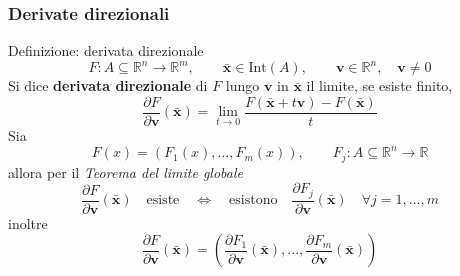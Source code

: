 \documentclass[x11names]{article}
\begin{document}
	\subsubsection{Derivate direzionali}
	\begin{center}
		\colorbox{myblue}{\begin{minipage}{5.75in}
				\begin{blues}{Definizione: derivata direzionale}
					\[
					F:A \subseteq \mathbb{R}^n \to \mathbb{R}^m, \qquad \boldsymbol{\bar{x}} \in \text{Int}(A), \qquad 					      \boldsymbol{v} \in \mathbb{R}^n, \quad \boldsymbol{v} \neq 0
					\]
					Si dice \textbf{derivata direzionale} di $F$ lungo $\boldsymbol{v}$ in  $\boldsymbol{\bar{x}}$ il limite, se esiste finito,
					\begin{equation}
						\frac{\partial F}{\partial \boldsymbol{v}}(\boldsymbol{\bar{x}}) = \lim_{t\to0} \frac{F( \boldsymbol{\bar{x}} + t \boldsymbol{v}) - F( \boldsymbol{\bar{x}} )}{t}
					\end{equation}
					Sia
					\[ 
					F(x) = \left(F_{1}(x),\dots,F_{m}(x)\right),\qquad F_{j}:A\subseteq \mathbb{R}^n\to\mathbb{R}
					\]
					allora per il \textit{Teorema del limite globale}
					\[ 
					\frac{\partial F}{\partial \boldsymbol{v}}(\boldsymbol{\bar{x}}) \quad \text{esiste} \quad \Longleftrightarrow \quad \text{esistono} \quad \frac{\partial F_{j}}{\partial 		\boldsymbol{v}}(\boldsymbol{\bar{x}}) \quad \forall j = 1,\dots,m
					\]
					inoltre
					\[ 
					\frac{\partial F}{\partial \boldsymbol{v}}(\boldsymbol{\bar{x}})=\left(\frac{\partial F_1}{\partial \boldsymbol{v}}(\boldsymbol{\bar{x}}),...,\frac{\partial F_m}{\partial \boldsymbol{v}}(\boldsymbol{\bar{x}})\right)
					\]
				\end{blues}
		\end{minipage}}       
	\end{center}
	
\end{document}
